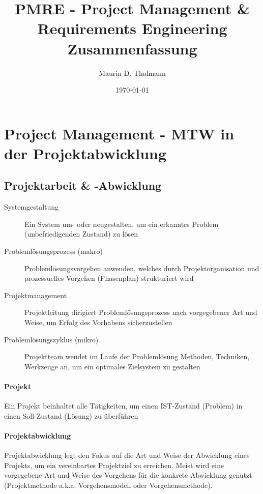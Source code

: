\documentclass[a4paper]{article}
\title{\textbf{PMRE - Project Management \& \\
		Requirements Engineering}\\
Zusammenfassung}
\date{\today}
\author{Maurin D. Thalmann}
\begin{document}
	
	\maketitle
	
\newpage
	\tableofcontents
	
\newpage
	
	\section{Project Management - MTW in der Projektabwicklung}
	
	
		\subsection{Projektarbeit \& -Abwicklung}
		
		\begin{description}
			\item[Systemgestaltung] Ein System um- oder neugestalten, um ein erkanntes Problem (unbefriedigenden Zustand) zu lösen
			\item[Problemlösungsprozess (makro)] Problemlösungsvorgehen anwenden, welches durch Projektorganisation und prozessuelles Vorgehen (Phasenplan) strukturiert wird
			\item[Projektmanagement] Projektleitung dirigiert Problemlösungsprozess nach vorgegebener Art und Weise, um Erfolg des Vorhabens sicherzustellen
			\item[Problemlösungszyklus (mikro)] Projektteam wendet im Laufe der Problemlösung Methoden, Techniken, Werkzeuge an, um ein optimales Zielsystem zu gestalten
		\end{description}
	
				\paragraph{Projekt}
				
				Ein Projekt beinhaltet alle Tätigkeiten, um einen IST-Zustand (Problem) in einen Soll-Zustand (Lösung) zu überführen
				
				\paragraph{Projektabwicklung}
				
				Projektabwicklung legt den Fokus auf die Art und Weise der Abwicklung eines Projekts, um ein vereinbartes Projektziel zu erreichen. 
				Meist wird eine vorgegebene Art und Weise des Vorgehens für die konkrete Abwicklung genutzt (Projektmethode a.k.a. Vorgehensmodell oder Vorgehensmethode).
				
\end{document}
